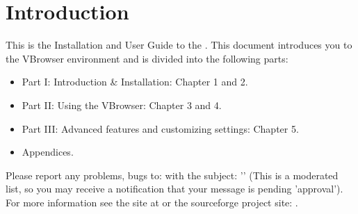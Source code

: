 \chapter{Introduction}
\label{sec:Introduction}




This is the Installation and User Guide to the \vbrowser. 
This document introduces you to the VBrowser 
environment and is divided into the following parts: 

\begin{itemize} 
  \item 
    Part I: Introduction \& Installation: Chapter 1 and 2.
  \item 
    Part II: Using the VBrowser: Chapter 3 and 4. 
  \item
    Part III: Advanced features and customizing settings: Chapter 5.  
  \item
    Appendices.  
\end{itemize} 

Please report any problems, bugs to:  with the subject: 
'' (This is a moderated list, so you may receive a
notification that your message is pending 'approval'). \\
For more information see the site at  or the
sourceforge project site: .
